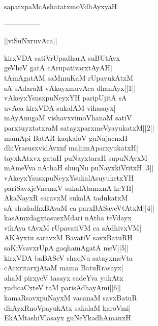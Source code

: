 \documentclass{article}
\begin{document}
\begin{center}
sapatxpaMcAshatatxmoVdhAyxyaH
\end{center}

\begin{center}

---------------
\end{center}

\begin{center}
||viSuNxruvAca||
\end{center}

kirxVDA satiVrUpadharA suBUtAvx\\
geVheV gatA cArupativarxtAyAH|\\
tAmAgatAM saMmuKaM rUpayukAtxM\\
sA sAdaraM vAkayxmuvAca dhanAyx||1||\\
vAkeyxYsusxpuNeyxYH paripUjitA sA\\
uvAca kirxVDA sukalAM vihasayx|\\
mAyAnugaM vishavxvimoVhanaM satiV\\
parxtuyxtatxraM satayxparxmeVyayukatxM||2||\\
mamApi BatAR kaqkaloV guNajacnxH\\
dhiVrasusxvidAvxnf mahimAparxyukatxH|\\
tayxkAtxvx gataH puNayxtaraH supuNAyxM\\
mAmeVva nAthaH shuqNu puNayxkiVritxH||3||\\
vAkeyxYsusxpuNeyxYsukalAsuyuketxYH\\
pariSavxjeVnemxV sukalAtamxnA keYH|\\
AkaNayxR saravxM sukalA tadukatxM\\
sA shudadhxBAvaM ca parxBASayeVtAtxM||4||\\
kasAmxdagxtasusxMdari nAtha teVdayx\\
vihAya tAvxM rUpavatiVM ca sAdhivxVM|\\
AKAyxtu saravxM BavatiV savxBatuRH\\
saKiVsavxrUpA gaqhamAgatA meV||5||\\
kirxVDA baBASeV shaqNu satayxmeVta\\
cAcxritarxjAtaM mama BatuRrasayx|\\
ahaM pirxyeV tasayx sadeYva yukAtx\\
yadicaCxteV taM parisAdhayAmi||6||\\
kamaRsavxpuNayxM vacanaM savxBatuR\\
dhAyxRnoVpayukAtx sakalaM karoVmi|\\
EkAMtashiVlasayx guNeYkadhAmanxH\\
\end{document}

